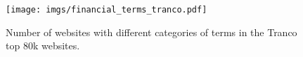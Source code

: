 \begin{figure}[!t] 
 \centering
 \texttt{[image: imgs/financial\_terms\_tranco.pdf]}
 \caption{Number of websites with different categories of \termname terms in the Tranco top 80k websites. }
\label{fig:tranco_rank_dist}
\end{figure}
